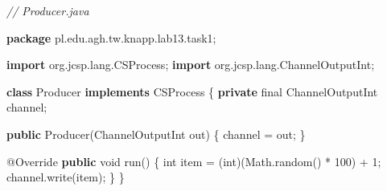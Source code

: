 \documentclass[11pt]{article}
\newenvironment{Shaded}{}{}
\newcommand{\KeywordTok}[1]{\textcolor[rgb]{0.00,0.44,0.13}{\textbf{{#1}}}}
\newcommand{\DataTypeTok}[1]{\textcolor[rgb]{0.56,0.13,0.00}{{#1}}}
\newcommand{\DecValTok}[1]{\textcolor[rgb]{0.25,0.63,0.44}{{#1}}}
\newcommand{\CommentTok}[1]{\textcolor[rgb]{0.38,0.63,0.69}{\textit{{#1}}}}
\newcommand{\FunctionTok}[1]{\textcolor[rgb]{0.02,0.16,0.49}{{#1}}}
\newcommand{\NormalTok}[1]{{#1}}
\newcommand{\ImportTok}[1]{{#1}}
\newcommand{\OperatorTok}[1]{\textcolor[rgb]{0.40,0.40,0.40}{{#1}}}
\newcommand{\BuiltInTok}[1]{{#1}}
\newcommand{\AttributeTok}[1]{\textcolor[rgb]{0.49,0.56,0.16}{{#1}}}
\begin{document}
    \begin{Shaded}
\begin{Highlighting}[]
\CommentTok{// Producer.java}

\KeywordTok{package}\ImportTok{ pl}\OperatorTok{.}\ImportTok{edu}\OperatorTok{.}\ImportTok{agh}\OperatorTok{.}\ImportTok{tw}\OperatorTok{.}\ImportTok{knapp}\OperatorTok{.}\ImportTok{lab13}\OperatorTok{.}\ImportTok{task1}\OperatorTok{;}

\KeywordTok{import} \ImportTok{org}\OperatorTok{.}\ImportTok{jcsp}\OperatorTok{.}\ImportTok{lang}\OperatorTok{.}\ImportTok{CSProcess}\OperatorTok{;}
\KeywordTok{import} \ImportTok{org}\OperatorTok{.}\ImportTok{jcsp}\OperatorTok{.}\ImportTok{lang}\OperatorTok{.}\ImportTok{ChannelOutputInt}\OperatorTok{;}

\KeywordTok{class}\NormalTok{ Producer }\KeywordTok{implements}\NormalTok{ CSProcess }\OperatorTok{\{}
    \KeywordTok{private} \DataTypeTok{final}\NormalTok{ ChannelOutputInt channel}\OperatorTok{;}

    \KeywordTok{public} \FunctionTok{Producer}\OperatorTok{(}\NormalTok{ChannelOutputInt out}\OperatorTok{)} \OperatorTok{\{}
\NormalTok{        channel }\OperatorTok{=}\NormalTok{ out}\OperatorTok{;}
    \OperatorTok{\}}

    \AttributeTok{@Override}
    \KeywordTok{public} \DataTypeTok{void} \FunctionTok{run}\OperatorTok{()} \OperatorTok{\{}
        \DataTypeTok{int}\NormalTok{ item }\OperatorTok{=} \OperatorTok{(}\DataTypeTok{int}\OperatorTok{)(}\BuiltInTok{Math}\OperatorTok{.}\FunctionTok{random}\OperatorTok{()} \OperatorTok{*} \DecValTok{100}\OperatorTok{)} \OperatorTok{+} \DecValTok{1}\OperatorTok{;}
\NormalTok{        channel}\OperatorTok{.}\FunctionTok{write}\OperatorTok{(}\NormalTok{item}\OperatorTok{);}
    \OperatorTok{\}}
\OperatorTok{\}}
\end{Highlighting}
\end{Shaded}
\end{document}
